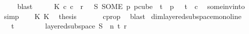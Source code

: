 \begin{isabellebody}
\ {\isacharasterisk}{\kern0pt}\ {\isacharasterisk}{\kern0pt}{\isacharasterisk}{\kern0pt}\ \isamarkupfalse%
\ blast\isanewline
\ \ \isamarkupfalse%
\ \isamarkupfalse%
\ K{}{\isacharcolon}{\kern0pt}\ {\isachardoublequoteopen}{\isasymexists}c{}{\isachardot}{\kern0pt}\ c{}\ {\isacharless}{\kern0pt}\ r\ {\isasymand}\ {\isasymchi}\ {\isacharparenleft}{\kern0pt}S\ {\isacharparenleft}{\kern0pt}SOME\ p{\isachardot}{\kern0pt}\ p{\isasymin}cube\ {}\ {\isacharparenleft}{\kern0pt}t{\isacharplus}{\kern0pt}{}{\isacharparenright}{\kern0pt}\ {\isasymand}\ p\ {}\ {\isacharequal}{\kern0pt}\ t{\isacharparenright}{\kern0pt}{\isacharparenright}{\kern0pt}\ {\isacharequal}{\kern0pt}\ c{}{\isachardoublequoteclose}\ \isamarkupfalse%
\ some{\isacharunderscore}{\kern0pt}inv{\isacharunderscore}{\kern0pt}into\ \isamarkupfalse%
\ simp\isanewline
\isanewline
\ \ \isamarkupfalse%
\ K{}\ K{}\ \isamarkupfalse%
\ {\isacharquery}{\kern0pt}thesis\ \isanewline
\ \ \ \ \isamarkupfalse%
\ c{}{\isacharunderscore}{\kern0pt}prop\ \isamarkupfalse%
\ blast\isanewline
{}\isamarkupfalse%
%
\endisatagproof
{\isafoldproof}%
%
\isadelimproof
\isanewline
%
\endisadelimproof
\isanewline
{}\isamarkupfalse%
\ dim{}{\isacharunderscore}{\kern0pt}layered{\isacharunderscore}{\kern0pt}subspace{\isacharunderscore}{\kern0pt}mono{\isacharunderscore}{\kern0pt}line{\isacharcolon}{\kern0pt}\ \isanewline
\ \ \ {\isachardoublequoteopen}t\ {\isachargreater}{\kern0pt}\ {}{\isachardoublequoteclose}\ \isanewline
\ \ \ \ \ {\isachardoublequoteopen}layered{\isacharunderscore}{\kern0pt}subspace\ S\ {}\ n\ t\ r\ {\isasymchi}{\isachardoublequoteclose}\isanewline

\end{isabellebody}
